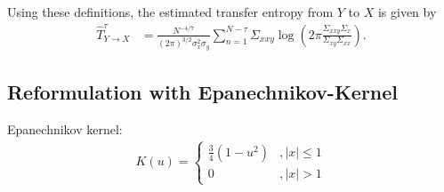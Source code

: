\documentclass[12pt,a4paper,twoside,english,fleqn,preprint,aps,prb]{revtex4}
\begin{document}
Using these definitions, the estimated transfer entropy from $Y$ to $X$ is
given by \begin{align} \hat{T}_{Y \rightarrow X}^{\tau} &=
\frac{N^{-4/7}}{(2\pi)^{3/2}\sigma_x^2 \sigma_y} \sum_{n=1}^{N-\tau}
\Sigma_{xxy} \log\left(2\pi \frac{\Sigma_{xxy} \Sigma_{x}}{\Sigma_{xy}
\Sigma_{xx}} \right).  \end{align}


\subsection{Reformulation with Epanechnikov-Kernel} Epanechnikov kernel:
\begin{align} K(u) = \begin{cases} \frac{3}{4}(1-u^{2}) &, |x| \leq 1\\ 0 &,
|x| > 1 \end{cases} \end{align}





\end{document}
